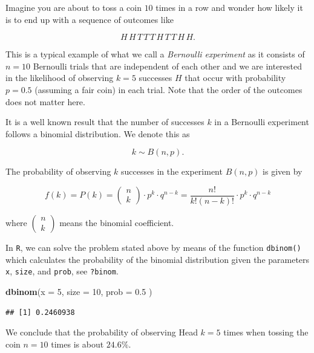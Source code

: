 \documentclass[]{book}
\newenvironment{Shaded}{\begin{snugshade}}{\end{snugshade}}
\newcommand{\KeywordTok}[1]{\textcolor[rgb]{0.13,0.29,0.53}{\textbf{#1}}}
\newcommand{\DataTypeTok}[1]{\textcolor[rgb]{0.13,0.29,0.53}{#1}}
\newcommand{\DecValTok}[1]{\textcolor[rgb]{0.00,0.00,0.81}{#1}}
\newcommand{\FloatTok}[1]{\textcolor[rgb]{0.00,0.00,0.81}{#1}}
\newcommand{\NormalTok}[1]{#1}
\theoremstyle{definition}
\theoremstyle{definition}
\theoremstyle{definition}
\theoremstyle{remark}
\begin{document}
Imagine you are about to toss a coin \(10\) times in a row and wonder
how likely it is to end up with a sequence of outcomes like

\[ H \, H \, T \, T \,T \,H \,T \,T \, H \, H .\]

This is a typical example of what we call a \emph{Bernoulli experiment}
as it consists of \(n=10\) Bernoulli trials that are independent of each
other and we are interested in the likelihood of observing \(k=5\)
successes \(H\) that occur with probability \(p=0.5\) (assuming a fair
coin) in each trial. Note that the order of the outcomes does not matter
here.

It is a well known result that the number of successes \(k\) in a
Bernoulli experiment follows a binomial distribution. We denote this as

\[k \sim B(n,p).\]

The probability of observing \(k\) successes in the experiment
\(B(n,p)\) is given by

\[f(k)=P(k)=\begin{pmatrix}n\\ k \end{pmatrix} \cdot p^k \cdot
q^{n-k}=\frac{n!}{k!(n-k)!} \cdot p^k \cdot q^{n-k}\]

where \(\begin{pmatrix}n\\ k \end{pmatrix}\) means the binomial
coefficient.

In \texttt{R}, we can solve the problem stated above by means of the
function \texttt{dbinom()} which calculates the probability of the
binomial distribution given the parameters \texttt{x}, \texttt{size},
and \texttt{prob}, see \texttt{?binom}.

\begin{Shaded}
\begin{Highlighting}[]
\KeywordTok{dbinom}\NormalTok{(}\DataTypeTok{x =} \DecValTok{5}\NormalTok{,}
       \DataTypeTok{size =} \DecValTok{10}\NormalTok{,}
       \DataTypeTok{prob =} \FloatTok{0.5}
\NormalTok{       ) }
\end{Highlighting}
\end{Shaded}

\begin{verbatim}
## [1] 0.2460938
\end{verbatim}

We conclude that the probability of observing Head \(k=5\) times when
tossing the coin \(n=10\) times is about \(24.6\%\).
\end{document}
